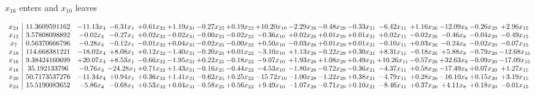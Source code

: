 \documentclass[9pt]{article}
\begin{document}
 $ x_{16} $ enters and $ x_{10} $ leaves 

 \[\begin{array}{c| c c@{\hskip 2pt} c@{\hskip 2pt} c@{\hskip 2pt} c@{\hskip 2pt} c@{\hskip 2pt} c@{\hskip 2pt} c@{\hskip 2pt} c@{\hskip 2pt} c@{\hskip 2pt} c@{\hskip 2pt} c@{\hskip 2pt} c@{\hskip 2pt} c@{\hskip 2pt} c@{\hskip 2pt} c@{\hskip 2pt} }
 x_{24}   &  11.3609591162 & -11.13 x_{4} & -6.31 x_{1} & +  0.61 x_{32} & +  1.19 x_{31} & -0.27 x_{25} & +  0.19 x_{22} & + 10.20 x_{10} & -2.29 x_{28} & -0.48 x_{29} & -0.33 x_{21} & -6.42 x_{11} & +  1.16 x_{26} & -12.09 x_{8} & -0.26 x_{20} & +  2.96 x_{15}\\
 x_{12}   &  3.57808098892 & -0.02 x_{4} & -0.27 x_{1} & +  0.02 x_{32} & -0.02 x_{31} & -0.00 x_{25} & -0.02 x_{22} & -0.36 x_{10} & +  0.02 x_{28} & +  0.01 x_{29} & +  0.01 x_{21} & +  0.02 x_{11} & -0.02 x_{26} & -0.46 x_{8} & -0.04 x_{20} & -0.49 x_{15}\\
 x_{7}   &  0.56370666796 & -0.28 x_{4} & -0.12 x_{1} & -0.01 x_{32} & +  0.04 x_{31} & -0.02 x_{25} & -0.00 x_{22} & +  0.50 x_{10} & -0.03 x_{28} & +  0.01 x_{29} & +  0.01 x_{21} & -0.10 x_{11} & +  0.03 x_{26} & -0.24 x_{8} & -0.02 x_{20} & -0.07 x_{15}\\
 x_{19}   &  114.668381221 & -18.02 x_{4} & +  8.08 x_{1} & +  0.12 x_{32} & -1.40 x_{31} & -0.20 x_{25} & +  0.01 x_{22} & -3.10 x_{10} & +  1.13 x_{28} & -0.22 x_{29} & +  0.30 x_{21} & +  8.31 x_{11} & -0.18 x_{26} & +  5.88 x_{8} & -0.79 x_{20} & -12.68 x_{15}\\
 x_{16}   &  9.38424160699 & + 20.07 x_{4} & +  8.53 x_{1} & -0.66 x_{32} & -1.95 x_{31} & +  0.22 x_{25} & -0.18 x_{22} & -9.07 x_{10} & +  1.93 x_{28} & +  1.08 x_{29} & +  0.49 x_{21} & + 10.26 x_{11} & -0.57 x_{26} & + 32.63 x_{8} & -0.09 x_{20} & -17.09 x_{15}\\
 x_{18}   &  35.192133796 & -0.76 x_{4} & -24.28 x_{1} & +  0.71 x_{32} & +  1.43 x_{31} & -0.16 x_{25} & -0.44 x_{22} & -4.53 x_{10} & -1.80 x_{28} & -0.72 x_{29} & -0.36 x_{21} & -4.37 x_{11} & +  0.58 x_{26} & -17.49 x_{8} & +  0.07 x_{20} & +  1.27 x_{15}\\
 x_{30}   &  50.7173537276 & -11.34 x_{4} & +  0.94 x_{1} & +  0.36 x_{32} & +  1.41 x_{31} & -0.62 x_{25} & +  0.25 x_{22} & -15.72 x_{10} & -1.00 x_{28} & -1.22 x_{29} & +  0.38 x_{21} & -4.79 x_{11} & +  0.28 x_{26} & -16.10 x_{8} & +  0.15 x_{20} & +  3.19 x_{15}\\
 x_{23}   &  15.5190083652 & -5.86 x_{4} & -0.68 x_{1} & +  0.53 x_{32} & +  0.04 x_{31} & -0.58 x_{25} & +  0.56 x_{22} & +  9.49 x_{10} & -1.07 x_{28} & -0.71 x_{29} & +  0.10 x_{21} & -8.46 x_{11} & +  0.37 x_{26} & +  4.11 x_{8} & +  0.18 x_{20} & -0.01 x_{15}\\

\end{array}\]
\end{document}
